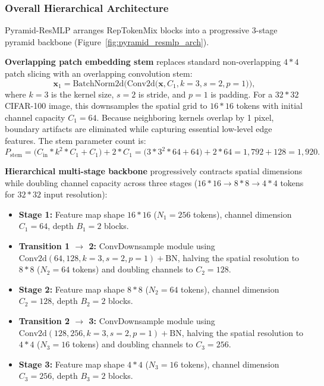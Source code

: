 \subsubsection{Overall Hierarchical Architecture}
\label{subsubsection:pyramid_macro}

Pyramid-ResMLP arranges RepTokenMix blocks into a progressive 3-stage pyramid backbone (Figure~\ref{fig:pyramid_resmlp_arch}).

\textbf{Overlapping patch embedding stem} replaces standard non-overlapping $4*4$ patch slicing with an overlapping convolution stem:
\begin{equation}
\mathbf{x}_1 = \text{BatchNorm2d}\Big(\text{Conv2d}\big(\mathbf{x}, C_1, k=3, s=2, p=1\big)\Big),
\end{equation}
where $k=3$ is the kernel size, $s=2$ is stride, and $p=1$ is padding. For a $32*32$ CIFAR-100 image, this downsamples the spatial grid to $16*16$ tokens with initial channel capacity $C_1 = 64$. Because neighboring kernels overlap by 1 pixel, boundary artifacts are eliminated while capturing essential low-level edge features. The stem parameter count is:
\begin{equation}
P_{\text{stem}} = \big(C_{\text{in}} * k^2 * C_1 + C_1\big) + 2 * C_1 = \big(3 * 3^2 * 64 + 64\big) + 2 * 64 = 1,792 + 128 = 1,920.
\end{equation}

\textbf{Hierarchical multi-stage backbone} progressively contracts spatial dimensions while doubling channel capacity across three stages ($16*16 \rightarrow 8*8 \rightarrow 4*4$ tokens for $32*32$ input resolution):
\begin{itemize}
    \item \textbf{Stage 1:} Feature map shape $16*16$ ($N_1 = 256$ tokens), channel dimension $C_1 = 64$, depth $B_1 = 2$ blocks.
    \item \textbf{Transition 1 $\rightarrow$ 2:} ConvDownsample module using $\text{Conv2d}(64, 128, k=3, s=2, p=1) + \text{BN}$, halving the spatial resolution to $8*8$ ($N_2 = 64$ tokens) and doubling channels to $C_2 = 128$.
    \item \textbf{Stage 2:} Feature map shape $8*8$ ($N_2 = 64$ tokens), channel dimension $C_2 = 128$, depth $B_2 = 2$ blocks.
    \item \textbf{Transition 2 $\rightarrow$ 3:} ConvDownsample module using $\text{Conv2d}(128, 256, k=3, s=2, p=1) + \text{BN}$, halving the spatial resolution to $4*4$ ($N_3 = 16$ tokens) and doubling channels to $C_3 = 256$.
    \item \textbf{Stage 3:} Feature map shape $4*4$ ($N_3 = 16$ tokens), channel dimension $C_3 = 256$, depth $B_3 = 2$ blocks.
\end{itemize}

